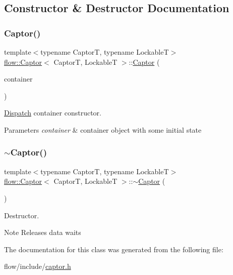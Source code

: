 \subsection{Constructor \& Destructor Documentation}
\mbox{\label{classflow_1_1_captor_a61bbbe60527baf460e8359a67910c277}} 
\subsubsection{\texorpdfstring{Captor()}{Captor()}}
{\footnotesize\ttfamily template$<$typename CaptorT, typename LockableT$>$ \\
\hyperlink{classflow_1_1_captor}{flow\+::\+Captor}$<$ CaptorT, LockableT $>$\+::\hyperlink{classflow_1_1_captor}{Captor} (\begin{DoxyParamCaption}\item[{const \hyperlink{classflow_1_1_captor_a9f10a93138e8a967a14e7c74215f22f8}{Dispatch\+Container\+Type} \&}]{container }\end{DoxyParamCaption})\hspace{0.3cm}{\ttfamily [explicit]}}



\hyperlink{classflow_1_1_dispatch}{Dispatch} container constructor. 


\begin{DoxyParams}{Parameters}
{\em container} & container object with some initial state \\
\hline
\end{DoxyParams}
\mbox{\label{classflow_1_1_captor_ac033d71daa64b6b7cd54a2351a37cd3c}} 
\subsubsection{\texorpdfstring{$\sim$\+Captor()}{~Captor()}}
{\footnotesize\ttfamily template$<$typename CaptorT, typename LockableT$>$ \\
\hyperlink{classflow_1_1_captor}{flow\+::\+Captor}$<$ CaptorT, LockableT $>$\+::$\sim$\hyperlink{classflow_1_1_captor}{Captor} (\begin{DoxyParamCaption}{ }\end{DoxyParamCaption})}



Destructor. 

\begin{DoxyNote}{Note}
Releases data waits 
\end{DoxyNote}


The documentation for this class was generated from the following file\+:\begin{DoxyCompactItemize}
\item 
flow/include/\hyperlink{captor_8h}{captor.\+h}\end{DoxyCompactItemize}
